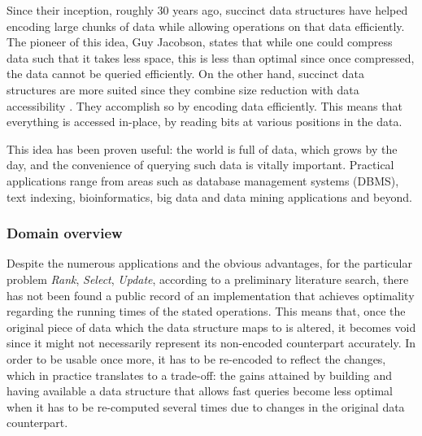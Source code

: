 Since their inception, roughly 30 years ago, succinct data structures have helped encoding large chunks of data while allowing operations on that data efficiently. The pioneer of this idea, Guy Jacobson, states that while one could compress data such that it takes less space, this is less than optimal since once compressed, the data cannot be queried efficiently. On the other hand, succinct data structures are more suited since they combine size reduction with data accessibility \cite{jacobson1988succinct}. They accomplish so by encoding data efficiently. This means that everything is accessed in-place, by reading bits at various positions in the data.

This idea has been proven useful: the world is full of data, which grows by the day, and the convenience of querying such data is vitally important. Practical applications range from areas such as database management systems (DBMS), text indexing, bioinformatics, big data and data mining applications and beyond.

\subsubsection*{Domain overview}
Despite the numerous applications and the obvious advantages, for the particular problem \textit{Rank}, \textit{Select}, \textit{Update}, according to a preliminary literature search, there has not been found a public record of an implementation that achieves optimality regarding the running times of the stated operations. This means that, once the original piece of data which the data structure maps to is altered, it becomes void since it might not necessarily represent its non-encoded counterpart accurately. In order to be usable once more, it has to be re-encoded to reflect the changes, which in practice translates to a trade-off: the gains attained by building and having available a data structure that allows fast queries become less optimal when it has to be re-computed several times due to changes in the original data counterpart.

